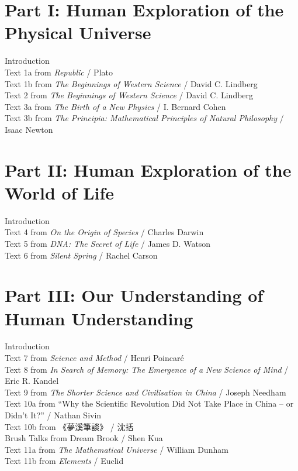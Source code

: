 \documentclass[UTF8,zihao=-4]{ctexart}
\begin{document}
\section*{Part I: Human Exploration of the Physical Universe}
\noindent Introduction \\
Text 1a from \textit{Republic} / Plato \\
Text 1b from \textit{The Beginnings of Western Science} / David C. Lindberg \\
Text 2 from \textit{The Beginnings of Western Science} / David C. Lindberg \\
Text 3a from \textit{The Birth of a New Physics} / I. Bernard Cohen \\
Text 3b from \textit{The Principia: Mathematical Principles of Natural Philosophy} / Isaac Newton 

\section*{Part II: Human Exploration of the World of Life}
\noindent Introduction \\
Text 4 from \textit{On the Origin of Species} / Charles Darwin \\
Text 5 from \textit{DNA: The Secret of Life} / James D. Watson \\
Text 6 from \textit{Silent Spring} / Rachel Carson 

\section*{Part III: Our Understanding of Human Understanding}
\noindent Introduction \\
Text 7 from \textit{Science and Method} / Henri Poincaré \\
Text 8 from \textit{In Search of Memory: The Emergence of a New Science of Mind} / Eric R. Kandel \\
Text 9 from \textit{The Shorter Science and Civilisation in China} / Joseph Needham \\
Text 10a from ``Why the Scientific Revolution Did Not Take Place in China -- or Didn't It?'' / Nathan Sivin \\
Text 10b from 《夢溪筆談》 / 沈括 \\
Brush Talks from Dream Brook / Shen Kua \\
Text 11a from \textit{The Mathematical Universe} / William Dunham \\
Text 11b from \textit{Elements} / Euclid 
\end{document}
